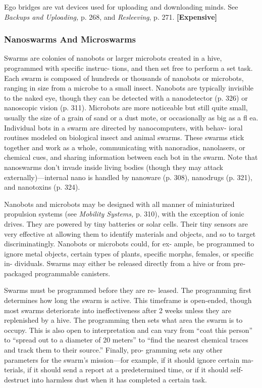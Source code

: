 Ego bridges are vat devices used for uploading and 
downloading minds. See \textit{Backups and Uploading,} p. 268, 
and \textit{Resleeving}, p. 271. \textbf{[Expensive]}

\subsubsection{Nanoswarms And Microswarms}

Swarms are colonies of nanobots or larger microbots 
created in a hive, programmed with specific instruc-
tions, and then set free to perform a set task. Each 
swarm is composed of hundreds or thousands of 
nanobots or microbots, ranging in size from a microbe 
to a small insect. Nanobots are typically invisible to 
the naked eye, though they can be detected with a 
nanodetector (p. 326) or nanoscopic vision (p. 311). 
Microbots are more noticeable but still quite small, 
usually the size of a grain of sand or a dust mote, 
or occasionally as big as a fl ea. Individual bots in a 
swarm are directed by nanocomputers, with behav-
ioral routines modeled on biological insect and animal 
swarms. These swarms stick together and work as a 
whole, communicating with nanoradios, nanolasers, 
or chemical cues, and sharing information between 
each bot in the swarm. Note that nanoswarms don't 
invade inside living bodies (though they may attack 
externally)—internal nano is handled by nanoware (p. 
308), nanodrugs (p. 321), and nanotoxins (p. 324).

Nanobots and microbots may be designed with 
all manner of miniaturized propulsion systems (see 
\textit{Mobility Systems,} p. 310), with the exception of ionic 
drives. They are powered by tiny batteries or solar 
cells. Their tiny sensors are very effective at allowing 
them to identify materials and objects, and so to target 
discriminatingly. Nanobots or microbots could, for ex-
ample, be programmed to ignore metal objects, certain 
types of plants, specific morphs, females, or specific in-
dividuals. Swarms may either be released directly from 
a hive or from pre-packaged programmable canisters.

Swarms must be programmed before they are re-
leased. The programming first determines how long 
the swarm is active. This timeframe is open-ended, 
though most swarms deteriorate into ineffectiveness 
after 2 weeks unless they are replenished by a hive. 
The programming then sets what area the swarm is 
to occupy. This is also open to interpretation and 
can vary from ``coat this person'' to ``spread out to a 
diameter of 20 meters'' to ``find the nearest chemical 
traces and track them to their source.'' Finally, pro-
gramming sets any other parameters for the swarm's 
mission—for example, if it should ignore certain ma-
terials, if it should send a report at a predetermined 
time, or if it should self-destruct into harmless dust 
when it has completed a certain task.

